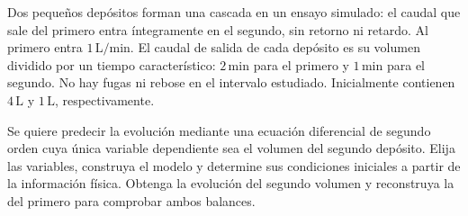 Dos pequeños depósitos forman una cascada en un ensayo simulado: el caudal que sale del primero entra íntegramente en el segundo, sin retorno ni retardo. Al primero entra \(1\,\mathrm{L/min}\). El caudal de salida de cada depósito es su volumen dividido por un tiempo característico: \(2\,\mathrm{min}\) para el primero y \(1\,\mathrm{min}\) para el segundo. No hay fugas ni rebose en el intervalo estudiado. Inicialmente contienen \(4\,\mathrm L\) y \(1\,\mathrm L\), respectivamente.

Se quiere predecir la evolución mediante una ecuación diferencial de segundo orden cuya única variable dependiente sea el volumen del segundo depósito. Elija las variables, construya el modelo y determine sus condiciones iniciales a partir de la información física. Obtenga la evolución del segundo volumen y reconstruya la del primero para comprobar ambos balances.

